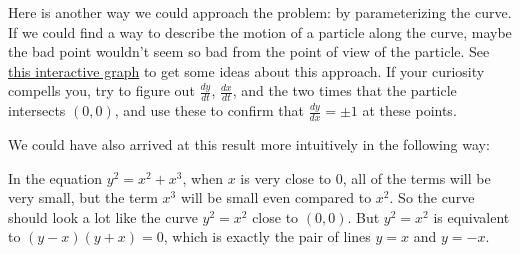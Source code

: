 \documentclass{ximera}
\begin{document}
\begin{exercise}
Here is another way we could approach the problem: by parameterizing
the curve.  If we could find a way to describe the motion of a
particle along the curve, maybe the bad point wouldn't seem so bad
from the point of view of the particle. See
\href{https://www.desmos.com/calculator/py0camtwlg}{this interactive
  graph} to get some ideas about this approach.  If your curiosity
compells you, try to figure out $\frac{dy}{dt}$, $\frac{dx}{dt}$, and
the two times that the particle intersects $(0,0)$, and use these to
confirm that $\frac{dy}{dx} = \pm 1$ at these points.

We could have also arrived at this result more intuitively in the following way:

In the equation $y^2 = x^2+x^3$, when $x$ is very close to $0$, all of
the terms will be very small, but the term $x^3$ will be small even
compared to $x^2$.  So the curve should look a lot like the curve $y^2
= x^2$ close to $(0,0)$.  But $y^2 = x^2$ is equivalent to
$(y-x)(y+x)=0$, which is exactly the pair of lines $y=x$ and $y=-x$.
\end{exercise}
\end{document}
